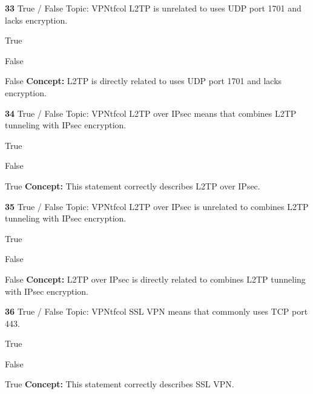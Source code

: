 \documentclass[10pt,a4paper]{article}
\begin{document}
\begin{qcard}{\color{white}\textbf{33} \hfill \small True / False \textbar{} Topic: VPN}{tfcol}
L2TP is unrelated to uses UDP port 1701 and lacks encryption.

\begin{qoptions}
\item True
\item False
\end{qoptions}
\begin{explainbox}{False}
\textbf{Concept:} L2TP is directly related to uses UDP port 1701 and lacks encryption.
\end{explainbox}
\end{qcard}

\begin{qcard}{\color{white}\textbf{34} \hfill \small True / False \textbar{} Topic: VPN}{tfcol}
L2TP over IPsec means that combines L2TP tunneling with IPsec encryption.

\begin{qoptions}
\item True
\item False
\end{qoptions}
\begin{explainbox}{True}
\textbf{Concept:} This statement correctly describes L2TP over IPsec.
\end{explainbox}
\end{qcard}

\begin{qcard}{\color{white}\textbf{35} \hfill \small True / False \textbar{} Topic: VPN}{tfcol}
L2TP over IPsec is unrelated to combines L2TP tunneling with IPsec encryption.

\begin{qoptions}
\item True
\item False
\end{qoptions}
\begin{explainbox}{False}
\textbf{Concept:} L2TP over IPsec is directly related to combines L2TP tunneling with IPsec encryption.
\end{explainbox}
\end{qcard}

\begin{qcard}{\color{white}\textbf{36} \hfill \small True / False \textbar{} Topic: VPN}{tfcol}
SSL VPN means that commonly uses TCP port 443.

\begin{qoptions}
\item True
\item False
\end{qoptions}
\begin{explainbox}{True}
\textbf{Concept:} This statement correctly describes SSL VPN.
\end{explainbox}
\end{qcard}
\end{document}
